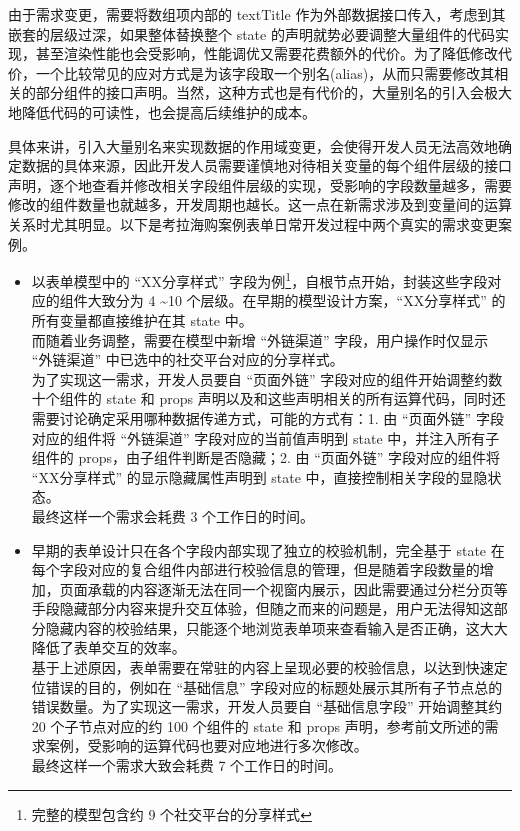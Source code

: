 \documentclass[winfonts,master,twoside]{njuthesis}
\begin{document}
由于需求变更，需要将数组项内部的 textTitle 作为外部数据接口传入，考虑到其嵌套的层级过深，如果整体替换整个 state 的声明就势必要调整大量组件的代码实现，甚至渲染性能也会受影响，性能调优又需要花费额外的代价。为了降低修改代价，一个比较常见的应对方式是为该字段取一个别名(alias)，从而只需要修改其相关的部分组件的接口声明。当然，这种方式也是有代价的，大量别名的引入会极大地降低代码的可读性，也会提高后续维护的成本\cite{aldrich2002alias}。

具体来讲，引入大量别名来实现数据的作用域变更，会使得开发人员无法高效地确定数据的具体来源，因此开发人员需要谨慎地对待相关变量的每个组件层级的接口声明，逐个地查看并修改相关字段组件层级的实现，受影响的字段数量越多，需要修改的组件数量也就越多，开发周期也越长。这一点在新需求涉及到变量间的运算关系时尤其明显。以下是考拉海购案例表单日常开发过程中两个真实的需求变更案例。

\begin{itemize}
    \item 以表单模型中的 “XX分享样式” 字段为例\footnote{完整的模型包含约 9 个社交平台的分享样式}，自根节点开始，封装这些字段对应的组件大致分为 4 \textasciitilde 10 个层级。在早期的模型设计方案，“XX分享样式” 的所有变量都直接维护在其 state 中。\\而随着业务调整，需要在模型中新增 “外链渠道” 字段，用户操作时仅显示 “外链渠道” 中已选中的社交平台对应的分享样式。\\为了实现这一需求，开发人员要自 “页面外链” 字段对应的组件开始调整约数十个组件的 state 和 props 声明以及和这些声明相关的所有运算代码，同时还需要讨论确定采用哪种数据传递方式，可能的方式有：1. 由 “页面外链” 字段对应的组件将 “外链渠道” 字段对应的当前值声明到 state 中，并注入所有子组件的 props，由子组件判断是否隐藏；2. 由 “页面外链” 字段对应的组件将 “XX分享样式” 的显示隐藏属性声明到 state 中，直接控制相关字段的显隐状态。\\最终这样一个需求会耗费 3 个工作日的时间。
    \item 早期的表单设计只在各个字段内部实现了独立的校验机制，完全基于 state 在每个字段对应的复合组件内部进行校验信息的管理，但是随着字段数量的增加，页面承载的内容逐渐无法在同一个视窗内展示，因此需要通过分栏分页等手段隐藏部分内容来提升交互体验，但随之而来的问题是，用户无法得知这部分隐藏内容的校验结果，只能逐个地浏览表单项来查看输入是否正确，这大大降低了表单交互的效率。\\基于上述原因，表单需要在常驻的内容上呈现必要的校验信息，以达到快速定位错误的目的，例如在 “基础信息” 字段对应的标题处展示其所有子节点总的错误数量。为了实现这一需求，开发人员要自 “基础信息字段” 开始调整其约 20 个子节点对应的约 100 个组件的 state 和 props 声明，参考前文所述的需求案例，受影响的运算代码也要对应地进行多次修改。\\最终这样一个需求大致会耗费 7 个工作日的时间。
\end{itemize}
\end{document}
